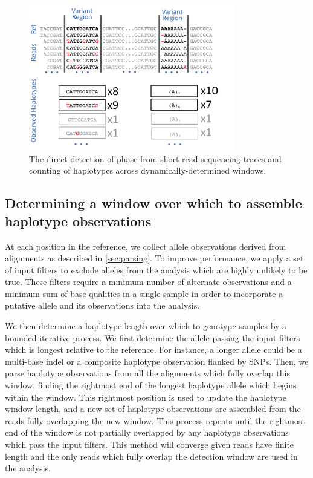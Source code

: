 \documentclass{article}
\begin{document}
\begin{figure}[h!]
\centering
\includegraphics[width=0.8\textwidth]{haplotype_calling}
\caption{The direct detection of phase from short-read sequencing traces and counting of haplotypes across dynamically-determined windows.}
\label{fig:haplotypecalling}
\end{figure}

\subsection{Determining a window over which to assemble haplotype observations}

At each position in the reference, we collect allele observations derived from alignments as described in \ref{sec:parsing}.  To improve performance, we apply a set of input filters to exclude alleles from the analysis which are highly unlikely to be true.  These filters require a minimum number of alternate observations and a minimum sum of base qualities in a single sample in order to incorporate a putative allele and its observations into the analysis.

We then determine a haplotype length over which to genotype samples by a bounded iterative process.  We first determine the allele passing the input filters which is longest relative to the reference.  For instance, a longer allele could be a multi-base indel or a composite haplotype observation flanked by SNPs.  Then, we parse haplotype observations from all the alignments which fully overlap this window, finding the rightmost end of the longest haplotype allele which begins within the window.  This rightmost position is used to update the haplotype window length, and a new set of haplotype observations are assembled from the reads fully overlapping the new window.  This process repeats until the rightmost end of the window is not partially overlapped by any haplotype observations which pass the input filters. This method will converge given reads have finite length and the only reads which fully overlap the detection window are used in the analysis.
\end{document}
